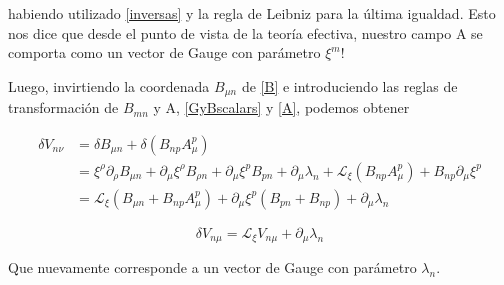 \documentclass{article}
\numberwithin{equation}{section}
\begin{document}
habiendo utilizado \ref{inversas} y la regla de Leibniz para la última igualdad. Esto nos dice que desde el punto de vista de la teoría efectiva, nuestro campo A se comporta como un vector de Gauge con parámetro $ \xi^m $! 

Luego, invirtiendo la coordenada $ B_{\mu n} $ de \ref{B} e introduciendo las reglas de transformación de $ B_{m n} $ y A, \ref{GyBscalars} y \ref{A}, podemos obtener 


\begin{equation*}
\begin{aligned}
\delta V_{n \nu} &= \delta B_	{\mu n}  + \delta \left( B_{n p} A^p_{\mu} \right)\\
&= \xi^{\rho} \partial_{\rho} B_{\mu n} + \partial_{\mu} \xi^{\rho} B_{\rho n} + \partial_{\mu} \xi^{p} B_{p n} + \partial_{\mu} \lambda_n + \mathcal{L}_{\xi} \left( B_{n p} A^p_{\mu} \right) + B_{n p} \partial_{\mu} \xi^p\\
&=\mathcal{L}_{\xi} \left( B_	{\mu n} +  B_{n p} A^p_{\mu} \right) + \partial_{\mu} \xi^p \left( B_{p n} + B_{n p}\right) + \partial_{\mu} \lambda_n
\end{aligned}
\end{equation*}

\begin{boxquation}
	\begin{equation}\label{V}
	\delta V_{n \mu}= \mathcal{L}_{\xi} V_{n \mu} + \partial_{\mu} \lambda_n
	\end{equation}
\end{boxquation}

Que nuevamente corresponde a un vector de Gauge con parámetro $ \lambda_n $.
\end{document}
